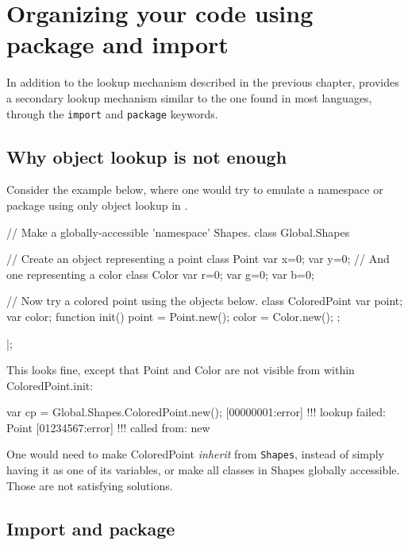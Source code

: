 
\chapter{Organizing your code using package and import}
\label{sec:tut:import}

In addition to the lookup mechanism described in the previous chapter,
\us provides a secondary lookup mechanism similar to the one found in
most languages, through the \lstinline{import} and \lstinline{package}
keywords.

\section{Why object lookup is not enough}

Consider the example below, where one would try to emulate a \Cxx namespace
or \Java package using only object lookup in \us.

\begin{urbiscript}
// Make a globally-accessible 'namespace' Shapes.
class Global.Shapes
{
  // Create an object representing a point
  class Point { var x=0; var y=0};
  // And one representing a color
  class Color { var r=0; var g=0; var b=0};

  // Now try a colored point using the objects below.
  class ColoredPoint
  {
    var point;
    var color;
    function init()
    {
      point = Point.new();
      color = Color.new();
    }
  };
}|;
\end{urbiscript}

This looks fine, except that Point and Color are not visible from within
ColoredPoint.init:

\begin{urbiscript}
var cp = Global.Shapes.ColoredPoint.new();
[00000001:error] !!! lookup failed: Point
[01234567:error] !!!    called from: new
\end{urbiscript}

One would need to make ColoredPoint {\it inherit} from \lstinline{Shapes},
instead of simply having it as one of its variables, or make all classes
in Shapes globally accessible. Those are not satisfying solutions.

\section{Import and package}

